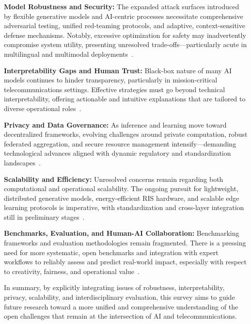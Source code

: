 \documentclass[sigconf]{acmart}
\begin{document}
\textbf{Model Robustness and Security:} The expanded attack surfaces introduced by flexible generative models and AI-centric processes necessitate comprehensive adversarial testing, unified red-teaming protocols, and adaptive, context-sensitive defense mechanisms. Notably, excessive optimization for safety may inadvertently compromise system utility, presenting unresolved trade-offs—particularly acute in multilingual and multimodal deployments~\cite{ref7, ref8, ref9, ref10, ref11, ref12}.

\textbf{Interpretability Gaps and Human Trust:} Black-box nature of many AI models continues to hinder transparency, particularly in mission-critical telecommunications settings. Effective strategies must go beyond technical interpretability, offering actionable and intuitive explanations that are tailored to diverse operational roles~\cite{ref43, ref44, ref45, ref46, ref47, ref48, ref49}.

\textbf{Privacy and Data Governance:} As inference and learning move toward decentralized frameworks, evolving challenges around private computation, robust federated aggregation, and secure resource management intensify—demanding technological advances aligned with dynamic regulatory and standardization landscapes~\cite{ref24, ref25, ref26, ref27, ref38, ref39, ref40}.

\textbf{Scalability and Efficiency:} Unresolved concerns remain regarding both computational and operational scalability. The ongoing pursuit for lightweight, distributed generative models, energy-efficient RIS hardware, and scalable edge learning protocols is imperative, with standardization and cross-layer integration still in preliminary stages~\cite{ref28, ref31, ref32, ref33, ref34, ref35, ref36}.

\textbf{Benchmarks, Evaluation, and Human-AI Collaboration:} Benchmarking frameworks and evaluation methodologies remain fragmented. There is a pressing need for more systematic, open benchmarks and integration with expert workflows to reliably assess and predict real-world impact, especially with respect to creativity, fairness, and operational value~\cite{ref6, ref13, ref19}.

In summary, by explicitly integrating issues of robustness, interpretability, privacy, scalability, and interdisciplinary evaluation, this survey aims to guide future research toward a more unified and comprehensive understanding of the open challenges that remain at the intersection of AI and telecommunications.
\end{document}

